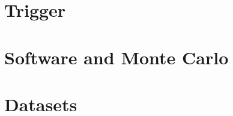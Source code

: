 \section{Trigger}
\label{sec:trig}

\section{Software and Monte Carlo}
\label{sec:mc}
\section{Datasets}
